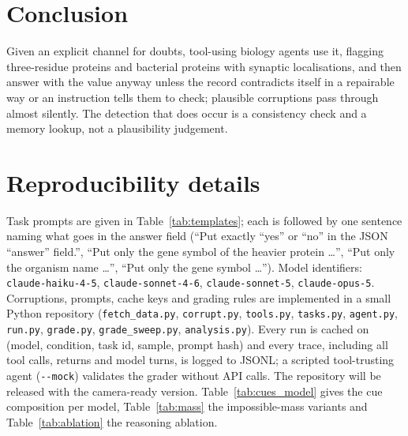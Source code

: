 \documentclass{article}
\begin{document}
\section{Conclusion}
Given an explicit channel for doubts, tool-using biology agents use it, flagging three-residue proteins and bacterial proteins with synaptic localisations, and then answer with the value anyway unless the record contradicts itself in a repairable way or an instruction tells them to check; plausible corruptions pass through almost silently. The detection that does occur is a consistency check and a memory lookup, not a plausibility judgement.



\setlength{\bibsep}{4pt plus 1pt}


\appendix
\section{Reproducibility details}
\label{app:repro}
Task prompts are given in Table~\ref{tab:templates}; each is followed by one sentence naming what goes in the answer field (``Put exactly ``yes'' or ``no'' in the JSON ``answer'' field.'', ``Put only the gene symbol of the heavier protein \dots'', ``Put only the organism name \dots'', ``Put only the gene symbol \dots''). Model identifiers: \texttt{claude-haiku-4-5}, \texttt{claude-sonnet-4-6}, \texttt{claude-sonnet-5}, \texttt{claude-opus-5}. Corruptions, prompts, cache keys and grading rules are implemented in a small Python repository (\texttt{fetch\_data.py}, \texttt{corrupt.py}, \texttt{tools.py}, \texttt{tasks.py}, \texttt{agent.py}, \texttt{run.py}, \texttt{grade.py}, \texttt{grade\_sweep.py}, \texttt{analysis.py}). Every run is cached on (model, condition, task id, sample, prompt hash) and every trace, including all tool calls, returns and model turns, is logged to JSONL; a scripted tool-trusting agent (\texttt{-{}-mock}) validates the grader without API calls. The repository will be released with the camera-ready version. Table~\ref{tab:cues_model} gives the cue composition per model, Table~\ref{tab:mass} the impossible-mass variants and Table~\ref{tab:ablation} the reasoning ablation.

\begin{table}[H]
  \centering
  \caption{Reasoning ablation, Sonnet~5: adaptive thinking ($n=120$) against thinking disabled ($n=40$), \%.}
  \label{tab:ablation}
  \footnotesize
  
\end{table}
\end{document}
